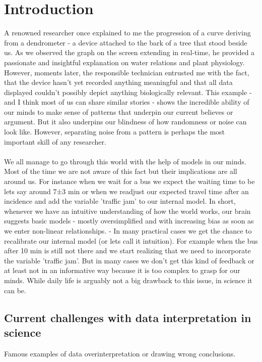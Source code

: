 \documentclass{article}
\begin{document}
\section*{Introduction}
A renowned researcher once explained to me the progression of a curve deriving from a dendrometer - a device attached to the bark of a tree that stood beside us. As we observed the graph on the screen extending in real-time, he provided a passionate and insightful explanation on water relations and plant physiology. However, moments later, the responsible technician entrusted me with the fact, that the device hasn't yet recorded anything meaningful and that all data displayed couldn't possibly depict anything biologically relevant. This example - and I think most of us can share similar stories - shows the incredible ability of our minds to make sense of patterns that underpin our current believes or argument. But it also underpins our blindness of how randomness or noise can look like. However, separating noise from a pattern is perhaps the most important skill of any researcher. \\ \\

We all manage to go through this world with the help of models in our minds. Most of the time we are not aware of this fact but their implications are all around us. For instance when we wait for a bus we expect the waiting time to be lets say around 7±3 min or when we readjust our expected travel time after an incidence and add the variable 'traffic jam' to our internal model. In short, whenever we have an intuitive understanding of how the world works, our brain suggests basic models - mostly oversimplified and with increasing bias as soon as we enter non-linear relationships.
- In many practical cases we get the chance to recalibrate our internal model (or lets call it intuition). For example when the bus after 10 min is still not there and we start realizing that we need to incorporate the variable 'traffic jam'.
But in many cases we don't get this kind of feedback or at least not in an informative way because it is too complex to grasp for our minds. While daily life is arguably not a big drawback to this issue, in science it can be. \\


\subsection*{Current challenges with data interpretation in science }
Famous examples of data overinterpretation or drawing wrong conclusions. \\
\end{document}

